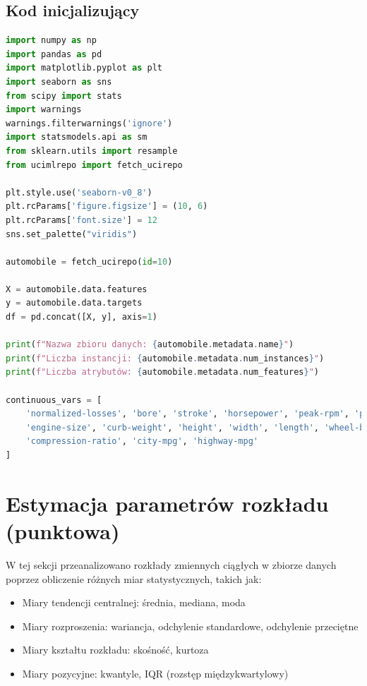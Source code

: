 \documentclass[12pt,a4paper]{article}
\begin{document}
\subsection{Kod inicjalizujący}
\begin{lstlisting}[language=Python, caption=Import bibliotek i wczytywanie danych]
import numpy as np
import pandas as pd
import matplotlib.pyplot as plt
import seaborn as sns
from scipy import stats
import warnings
warnings.filterwarnings('ignore')
import statsmodels.api as sm
from sklearn.utils import resample
from ucimlrepo import fetch_ucirepo

plt.style.use('seaborn-v0_8')
plt.rcParams['figure.figsize'] = (10, 6)
plt.rcParams['font.size'] = 12
sns.set_palette("viridis")

automobile = fetch_ucirepo(id=10)

X = automobile.data.features
y = automobile.data.targets
df = pd.concat([X, y], axis=1)

print(f"Nazwa zbioru danych: {automobile.metadata.name}")
print(f"Liczba instancji: {automobile.metadata.num_instances}")
print(f"Liczba atrybutów: {automobile.metadata.num_features}")

continuous_vars = [
    'normalized-losses', 'bore', 'stroke', 'horsepower', 'peak-rpm', 'price',
    'engine-size', 'curb-weight', 'height', 'width', 'length', 'wheel-base',
    'compression-ratio', 'city-mpg', 'highway-mpg'
]
\end{lstlisting}

\section{Estymacja parametrów rozkładu (punktowa)}

W tej sekcji przeanalizowano rozkłady zmiennych ciągłych w zbiorze danych poprzez obliczenie różnych miar statystycznych, takich jak:
\begin{itemize}
    \item Miary tendencji centralnej: średnia, mediana, moda
    \item Miary rozproszenia: wariancja, odchylenie standardowe, odchylenie przeciętne
    \item Miary kształtu rozkładu: skośność, kurtoza
    \item Miary pozycyjne: kwantyle, IQR (rozstęp międzykwartylowy)
\end{itemize}
\end{document}
